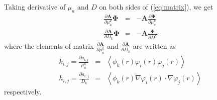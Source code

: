 \documentclass[12pt]{book}               %
\begin{document}
Taking derivative of $\mu_a$ and $D$ on both sides of
(\ref{eq:matrix}), we get
\begin{eqnarray}
\frac{\partial \mathbf{A}}{\partial
\mu_a^k}{\boldsymbol\Phi}&=&-\mathbf{A}\frac{\partial {\boldsymbol\Phi}}{\partial \mu_a^k}\\
\frac{\partial \mathbf{A}}{\partial
D_k}{\boldsymbol\Phi}&=&-\mathbf{A}\frac{\boldsymbol\Phi}{\partial
D^k}
\end{eqnarray}
where the elements of matrix $\frac{\partial \mathbf{A}}{\partial
\mu_a^k}$ and $\frac{\partial \mathbf{A}}{\partial D_k}$ are
written as
\begin{eqnarray}
k_{i,j}=\frac{\partial
a_{i,j}}{\mu_a^k}&=&\left\langle\phi_k(r)\varphi_i(r)\varphi_j(r)\right\rangle\\
h_{i,j}=\frac{\partial a_{i,j}}{D_k}&=&\left\langle
\phi_k(r)\nabla\varphi_i(r)\cdot\nabla\varphi_j(r)\right\rangle
\end{eqnarray}
respectively.
\end{document}
